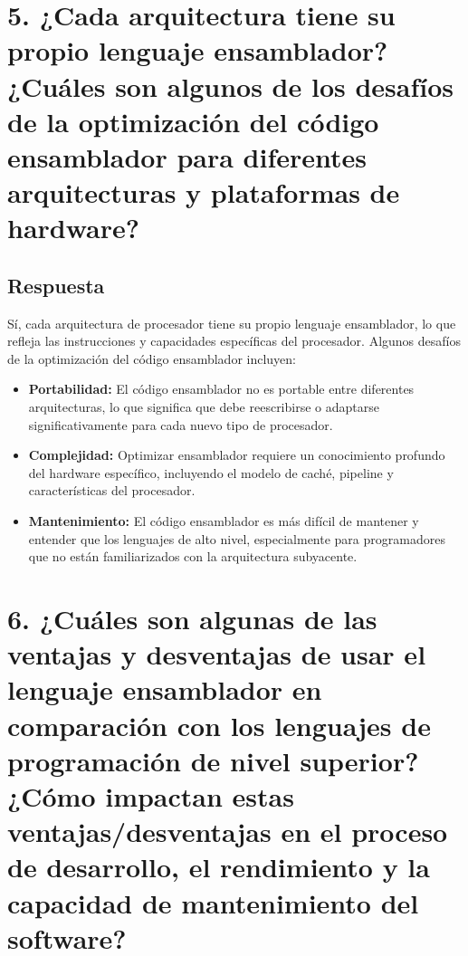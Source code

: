 \documentclass{article}
\begin{document}
\section*{5. ¿Cada arquitectura tiene su propio lenguaje ensamblador? ¿Cuáles son algunos de los desafíos de la optimización del código ensamblador para diferentes arquitecturas y plataformas de hardware?}
\subsection*{Respuesta}
Sí, cada arquitectura de procesador tiene su propio lenguaje ensamblador, lo que refleja las instrucciones y capacidades específicas del procesador. Algunos desafíos de la optimización del código ensamblador incluyen:
\begin{itemize}
    \item \textbf{Portabilidad:} El código ensamblador no es portable entre diferentes arquitecturas, lo que significa que debe reescribirse o adaptarse significativamente para cada nuevo tipo de procesador.
    \item \textbf{Complejidad:} Optimizar ensamblador requiere un conocimiento profundo del hardware específico, incluyendo el modelo de caché, pipeline y características del procesador.
    \item \textbf{Mantenimiento:} El código ensamblador es más difícil de mantener y entender que los lenguajes de alto nivel, especialmente para programadores que no están familiarizados con la arquitectura subyacente.
\end{itemize}

\section*{6. ¿Cuáles son algunas de las ventajas y desventajas de usar el lenguaje ensamblador en comparación con los lenguajes de programación de nivel superior? ¿Cómo impactan estas ventajas/desventajas en el proceso de desarrollo, el rendimiento y la capacidad de mantenimiento del software?}
\end{document}
